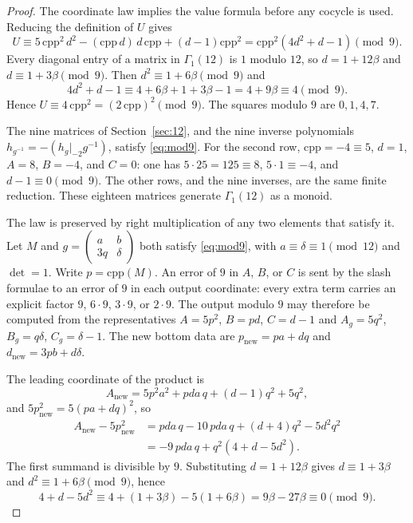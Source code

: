 \documentclass[11pt]{article}
\theoremstyle{remark}
\begin{document}
\begin{proof}
The coordinate law implies the value formula before any cocycle is used.
Reducing the definition of \(U\) gives
\[
U\equiv 5\,\mathrm{cpp}^2\,d^2-(\mathrm{cpp}\,d)\,d\,\mathrm{cpp}+(d-1)\mathrm{cpp}^2
=\mathrm{cpp}^2(4d^2+d-1)\pmod{9}.
\]
Every diagonal entry of a matrix in \(\Gamma_1(12)\) is \(1\) modulo \(12\), so \(d=1+12\beta\) and \(d\equiv 1+3\beta\pmod{9}\).
Then \(d^2\equiv 1+6\beta\pmod{9}\) and
\[
4d^2+d-1\equiv 4+6\beta+1+3\beta-1=4+9\beta\equiv 4\pmod{9}.
\]
Hence \(U\equiv 4\,\mathrm{cpp}^2=(2\,\mathrm{cpp})^2\pmod{9}\).
The squares modulo \(9\) are \(0,1,4,7\).

The nine matrices of Section~\ref{sec:12}, and the nine inverse polynomials \(h_{g^{-1}}=-(h_g|_{-2}g^{-1})\), satisfy \eqref{eq:mod9}.
For the second row, \(\mathrm{cpp}=-4\equiv 5\), \(d=1\), \(A=8\), \(B=-4\), and \(C=0\): one has \(5\cdot 25=125\equiv 8\), \(5\cdot 1\equiv -4\), and \(d-1\equiv 0\pmod{9}\).
The other rows, and the nine inverses, are the same finite reduction.
These eighteen matrices generate \(\Gamma_1(12)\) as a monoid.

The law is preserved by right multiplication of any two elements that satisfy it.
Let \(M\) and \(g=\begin{pmatrix}a&b\\3q&\delta\end{pmatrix}\) both satisfy \eqref{eq:mod9}, with \(a\equiv\delta\equiv 1\pmod{12}\) and \(\det=1\).
Write \(p=\mathrm{cpp}(M)\).
An error of \(9\) in \(A\), \(B\), or \(C\) is sent by the slash formulae to an error of \(9\) in each output coordinate: every extra term carries an explicit factor \(9\), \(6\cdot 9\), \(3\cdot 9\), or \(2\cdot 9\).
The output modulo \(9\) may therefore be computed from the representatives \(A=5p^2\), \(B=pd\), \(C=d-1\) and \(A_g=5q^2\), \(B_g=q\delta\), \(C_g=\delta-1\).
The new bottom data are \(p_{\mathrm{new}}=pa+dq\) and \(d_{\mathrm{new}}=3pb+d\delta\).

The leading coordinate of the product is
\[
A_{\mathrm{new}}=5p^2 a^2+pda\,q+(d-1)q^2+5q^2,
\]
and \(5p_{\mathrm{new}}^2=5(pa+dq)^2\), so
\begin{align*}
A_{\mathrm{new}}-5p_{\mathrm{new}}^2
&=pda\,q-10\,pda\,q+(d+4)q^2-5d^2 q^2\\
&=-9\,pda\,q+q^2(4+d-5d^2).
\end{align*}
The first summand is divisible by \(9\).
Substituting \(d=1+12\beta\) gives \(d\equiv 1+3\beta\) and \(d^2\equiv 1+6\beta\pmod{9}\), hence
\[
4+d-5d^2\equiv 4+(1+3\beta)-5(1+6\beta)=9\beta-27\beta\equiv 0\pmod{9}.
\]


\end{proof}
\end{document}
